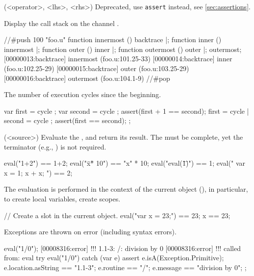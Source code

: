 \begin{urbiscriptapi}
\item[assert_op](<operator>, <lhs>, <rhs>)%
  Deprecated, use \lstinline|assert| instead, see \autoref{sec:assertions}.


\item[backtrace]%
  Display the call stack on the channel . \experimental
\begin{urbiscript}
//#push 100 "foo.u"
function innermost () { backtrace }|;
function inner ()     { innermost }|;
function outer ()     { inner }|;
function outermost () { outer }|;
outermost;
[00000013:backtrace] innermost (foo.u:101.25-33)
[00000014:backtrace] inner (foo.u:102.25-29)
[00000015:backtrace] outer (foo.u:103.25-29)
[00000016:backtrace] outermost (foo.u:104.1-9)
//#pop
\end{urbiscript}






\item[cycle]%
  The number of execution cycles since the beginning. \experimental
\begin{urbiscript}
{
  var first = cycle ; var second = cycle ;
  assert(first + 1 == second);
  first = cycle | second = cycle ;
  assert(first == second);
};
\end{urbiscript}


\item[eval](<source>)%
  Evaluate the \us {}, and return its result.  The
   must be complete, yet the terminator (e.g., \samp{;})
  is not required.
\begin{urbiassert}
eval("1+2") == 1+2;
eval("\"x\" * 10") == "x" * 10;
eval("eval(\"1\")") == 1;
eval("{ var x = 1; x + x; }") == 2;
\end{urbiassert}

  The evaluation is performed in the context of the current object
  (\this), in particular, to create local variables, create
  scopes.
\begin{urbiassert}
// Create a slot in the current object.
eval("var x = 23;") == 23;
x == 23;
\end{urbiassert}

  Exceptions are thrown on error (including syntax errors).
\begin{urbiscript}
eval("1/0");
[00008316:error] !!! 1.1-3: /: division by 0
[00008316:error] !!!    called from: eval
try
{
  eval("1/0")
}
catch (var e)
{
  assert
  {
    e.isA(Exception.Primitive);
    e.location.asString  == "1.1-3";
    e.routine            == "/";
    e.message            == "division by 0";
  }
};
\end{urbiscript}


\end{urbiscriptapi}

